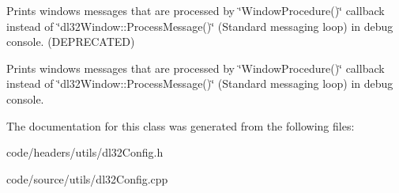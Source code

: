 Prints windows messages that are processed by \char`\"{}\-Window\-Procedure()\char`\"{} callback instead of \char`\"{}dl32\-Window\-::\-Process\-Message()\char`\"{} (Standard messaging loop) in debug console. (D\-E\-P\-R\-E\-C\-A\-T\-E\-D) 

Prints windows messages that are processed by \char`\"{}\-Window\-Procedure()\char`\"{} callback instead of \char`\"{}dl32\-Window\-::\-Process\-Message()\char`\"{} (Standard messaging loop) in debug console. 

The documentation for this class was generated from the following files\-:\begin{DoxyCompactItemize}
\item 
code/headers/utils/dl32\-Config.\-h\item 
code/source/utils/dl32\-Config.\-cpp\end{DoxyCompactItemize}
